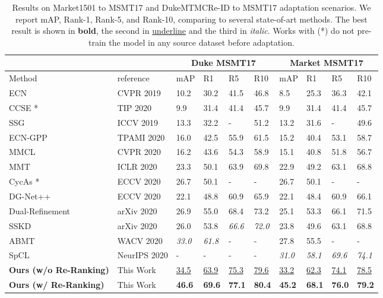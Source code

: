 \documentclass[journal]{IEEEtran}
\begin{document}
\begin{table*}[ht]
\caption{Results on Market1501 to MSMT17 and DukeMTMCRe-ID to MSMT17 adaptation scenarios. We report mAP, Rank-1, Rank-5, and Rank-10, comparing to several state-of-art methods. The best result is shown in \textbf{bold}, the second in \underline{underline} and the third in \textit{italic}. Works with (*) do not pre-train the model in any source dataset before adaptation.}
\label{tab:msmt17}
\centering
\begin{tabular}{|p{2.7cm}| p{2.0cm}|p{0.8cm}|p{1.0cm}|p{1.0cm}|p{1.0cm}|p{0.8cm}|p{1.0cm}|p{1.0cm}|p{1.0cm}|}
\hline
\multicolumn{1}{|c|}{} &
\multicolumn{1}{|c|}{} &
\multicolumn{4}{|c|}{Duke  MSMT17} & \multicolumn{4}{|c|}{Market  MSMT17} \\
\hline
Method & reference & mAP & R1 & R5 & R10
& mAP & R1 & R5 & R10 \\ \hline
ECN \cite{zhong2019invariance} & CVPR 2019 & 10.2 & 30.2 & 41.5 & 46.8 & 8.5 & 25.3 & 36.3 & 42.1 \\
CCSE \cite{lin2020unsupervisedccse}* & TIP 2020 & 9.9 & 31.4 & 41.4 & 45.7 & 9.9 & 31.4 & 41.4 & 45.7 \\
SSG \cite{fu2019self} & ICCV 2019 & 13.3 & 32.2 & - & 51.2 & 13.2 & 31.6 & - & 49.6 \\
ECN-GPP \cite{zhong2020learning} & TPAMI 2020 & 16.0 & 42.5 & 55.9 & 61.5 & 15.2 & 40.4 & 53.1 & 58.7 \\
MMCL \cite{wang2020unsupervised} & CVPR 2020 & 16.2 & 43.6 & 54.3 & 58.9 & 15.1 & 40.8 & 51.8 & 56.7 \\
MMT \cite{ge2020mutual} & ICLR 2020 & 23.3 & 50.1 & 63.9 & 69.8 & 22.9 & 49.2 & 63.1 & 68.8 \\
CycAs \cite{wang2020cycas}* & ECCV 2020 & 26.7 & 50.1 & - & - & 26.7 & 50.1 & - & - \\
DG-Net++  \cite{zou2020joint} & ECCV 2020 & 22.1 & 48.8 & 60.9 & 65.9 & 22.1 & 48.4 & 60.9 & 66.1 \\
Dual-Refinement \cite{dai2020dual} & arXiv 2020 & 26.9 & 55.0 & 68.4 & 73.2 & 25.1 & 53.3 & 66.1 & 71.5 \\
SSKD \cite{yin2020sskd} & arXiv 2020 & 26.0 & 53.8 & \textit{66.6} & \textit{72.0} & 23.8 & 49.6 & 63.1 & 68.8 \\ 
ABMT \cite{chen2020enhancing} & WACV 2020 & \textit{33.0} & \textit{61.8} & - & - & 27.8 & 55.5 & - & - \\ 
SpCL \cite{ge2020self} & NeurIPS 2020 & - & - & - & - & \textit{31.0} & \textit{58.1} & \textit{69.6} & \textit{74.1} \\ \hline
\textbf{Ours (w/o Re-Ranking)} & This Work & \underline{34.5} & \underline{63.9} & \underline{75.3} & \underline{79.6} & \underline{33.2} & \underline{62.3} & \underline{74.1} & \underline{78.5} \\ \hline
\textbf{Ours (w/ Re-Ranking)} & This Work & \textbf{46.6} & \textbf{69.6} & \textbf{77.1} & \textbf{80.4} & \textbf{45.2} & \textbf{68.1} & \textbf{76.0} & \textbf{79.2} \\ \hline
\end{tabular}
\end{table*}
\end{document}
